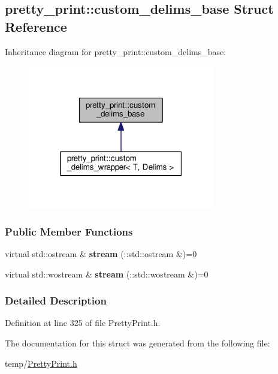 \hypertarget{structpretty__print_1_1custom__delims__base}{}\subsection{pretty\+\_\+print\+:\+:custom\+\_\+delims\+\_\+base Struct Reference}
\label{structpretty__print_1_1custom__delims__base}


Inheritance diagram for pretty\+\_\+print\+:\+:custom\+\_\+delims\+\_\+base\+:\nopagebreak
\begin{figure}[H]
\begin{center}
\leavevmode
\includegraphics[width=231pt]{structpretty__print_1_1custom__delims__base__inherit__graph}
\end{center}
\end{figure}
\subsubsection*{Public Member Functions}
\begin{DoxyCompactItemize}
\item 
virtual std\+::ostream \& {\bfseries stream} (\+::std\+::ostream \&)=0\hypertarget{structpretty__print_1_1custom__delims__base_af1cdfd5a95544e03ab668aea96c694a5}{}\label{structpretty__print_1_1custom__delims__base_af1cdfd5a95544e03ab668aea96c694a5}

\item 
virtual std\+::wostream \& {\bfseries stream} (\+::std\+::wostream \&)=0\hypertarget{structpretty__print_1_1custom__delims__base_a4b92573a491f6475ad861d17e8408f5b}{}\label{structpretty__print_1_1custom__delims__base_a4b92573a491f6475ad861d17e8408f5b}

\end{DoxyCompactItemize}


\subsubsection{Detailed Description}


Definition at line 325 of file Pretty\+Print.\+h.



The documentation for this struct was generated from the following file\+:\begin{DoxyCompactItemize}
\item 
temp/\hyperlink{PrettyPrint_8h}{Pretty\+Print.\+h}\end{DoxyCompactItemize}

